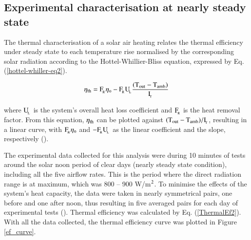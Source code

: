 \subsection{Experimental characterisation at nearly steady state}

The thermal characterisation of a solar air heating relates the thermal efficiency under steady state to each temperature rise normalised by the corresponding solar radiation according to the Hottel-Whillier-Bliss equation, expressed by Eq. (\ref{hottel-whiller-eq2}).

\vspace{-0.75cm}
\begin{equation}
\mathrm{\eta_{\rm{th}} = {F_{\!_R}}\eta_o - {F_{\!_R}}{U_{\!_L}}\frac{(T_{out} - T_{amb})}{I_{\!_T}}}
\label{hottel-whiller-eq2}
\end{equation}

\noindent where $\rm{U_{\!_L}}$ is the system's overall heat loss coefficient and $\rm{F_{\!_R}}$ is the heat removal factor. From this equation, $\eta_{\rm{th}}$ can be plotted against $\rm{(T_{out} - T_{amb})/I_{\!_T}}$, resulting in a linear curve, with $\rm{F_{\!_R}}\eta_{\rm{o}}$ and $\rm{- F_{\!_R}{U_{\!_L}}}$ as the linear coefficient and the slope, respectively (\cite{Goswami2015}). 

The experimental data collected for this analysis were during 10 minutes of tests around the solar noon period of clear days (nearly steady state condition), including all the five airflow rates. This is the period where the direct radiation range is at maximum, which was 800 -- 900 W/m$^{\rm{2}}$. To minimise the effects of the system's heat capacity, the data were taken in nearly symmetrical pairs, one before and one after noon, thus resulting in five averaged pairs for each day of experimental tests (\cite{Duffie2013}). Thermal efficiency was calculated by Eq. (\ref{ThermalEf2}). With all the data collected, the thermal efficiency curve was plotted in Figure \ref{ef_curve}. 


